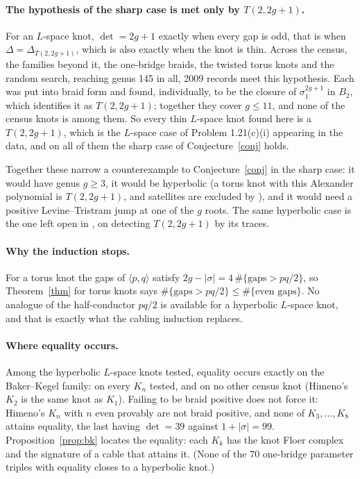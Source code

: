 \documentclass[11pt]{article}
\theoremstyle{definition}
\begin{document}
\paragraph{The hypothesis of the sharp case is met only by $T(2,2g+1)$.} For an $L$-space knot, $\det = 2g+1$ exactly
when every gap is odd, that is when $\Delta = \Delta_{T(2,2g+1)}$, which is also exactly when the knot is thin. Across the
census, the families beyond it, the one-bridge braids, the twisted torus knots and the random search, reaching genus
145 in all, 2009 records meet this hypothesis. Each was put into braid form and found, individually, to be the
closure of $\sigma_1^{2g+1}$ in $B_2$, which identifies it as $T(2,2g+1)$; together they cover $g \le 11$, and
none of the census knots is among them. So every thin $L$-space knot found here is a $T(2,2g+1)$, which is the
$L$-space case of Problem 1.21(c)(i) appearing in the data, and on all of them the sharp case of
Conjecture~\ref{conj} holds.

Together these narrow a counterexample to Conjecture~\ref{conj} in the sharp case: it would have genus $g \ge 3$, it
would be hyperbolic (a torus knot with this Alexander polynomial is $T(2,2g+1)$, and satellites are excluded by
\cite[Proposition 6.8]{BS}), and it would need a positive Levine--Tristram jump at one of the $g$ roots. The same
hyperbolic case is the one left open in \cite[Theorem 1.6]{BS}, on detecting $T(2,2g+1)$ by its traces.

\paragraph{Why the induction stops.} For a torus knot the gaps of $\langle p,q \rangle$ satisfy
$2g - |\sigma| = 4\,\#\{\text{gaps} > pq/2\}$, so Theorem~\ref{thm} for torus knots says
$\#\{\text{gaps} > pq/2\} \le \#\{\text{even gaps}\}$. No analogue of the half-conductor $pq/2$ is available for a
hyperbolic $L$-space knot, and that is exactly what the cabling induction replaces.

\paragraph{Where equality occurs.} Among the hyperbolic $L$-space knots tested, equality occurs exactly on the
Baker--Kegel family: on every $K_n$ tested, and on no other census knot (Himeno's $K_2$ is the same knot as $K_1$). Failing
to be braid positive does not force it: Himeno's $K_n$ with $n$ even provably are not braid positive, and none of
$K_3, \dots, K_{8}$ attains equality, the last having $\det = 39$ against $1 + |\sigma| = 99$.
Proposition~\ref{prop:bk} locates the equality: each $K_k$ has the knot Floer complex and the signature of a cable
that attains it. (None of the 70 one-bridge parameter triples with equality closes to a hyperbolic knot.)
\end{document}
